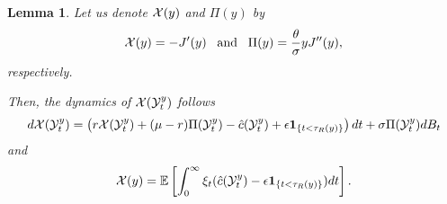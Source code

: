 \documentclass[a4paper,report, 11pt]{article}
\newtheorem{lem}{Lemma}[section]
\def\e{\epsilon}
\def\m{\mu}
\def\s{\sigma}
\def\t{\theta}
\begin{document}
\begin{lem}\label{lem:wealth-y}
	Let us denote ${\cal X}(y)$ and ${\Pi}(y)$ by 
	\begin{equation*}
	{\cal X}(y) = -J'(y)\;\;\;\mbox{and}\;\;\;\Pi(y)=\dfrac{\t}{\s}yJ''(y), 
	\end{equation*}
	respectively.
	
	Then, the dynamics of ${\cal X}({\cal Y}_t^y)$ follows 
	\begin{equation*}
	d{\cal X}({\cal Y}_t^{y})=\left( r{\cal X}({\cal Y}_t^{y})+(\m-r)\Pi({\cal Y}_t^y)-\hat{c}({\cal Y}_t^{y})+ \e{\bf 1}_{\{t<\tau_R(y)\}}\right)dt+\s \Pi({\cal Y}_t^y) dB_t
	\end{equation*}
	and 
	\begin{equation*}
	{\cal X}(y)= \mathbb{E}\left[\int_0^{\infty}\xi_t(\hat{c}({\cal Y}_t^y) -\e {\bf 1}_{\{t<\tau_R(y)\}})dt\right].
	\end{equation*}
\end{lem}
\end{document}
